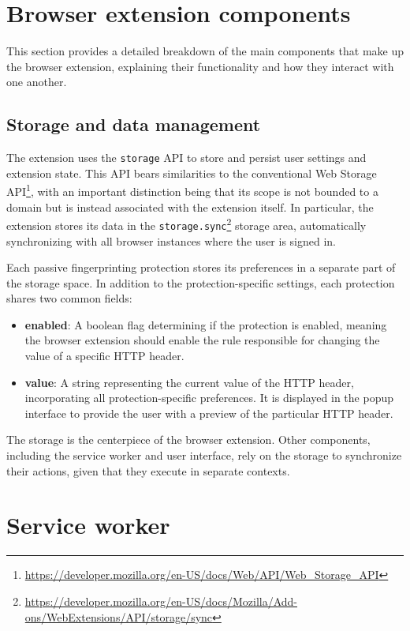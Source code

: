\section{Browser extension components}

This section provides a detailed breakdown of the main components that make up the browser extension, explaining their functionality and how they interact with one another.

\subsection{Storage and data management}

The extension uses the \texttt{storage} API to store and persist user settings and extension state. This API bears similarities to the conventional Web Storage API\footnote{\url{https://developer.mozilla.org/en-US/docs/Web/API/Web_Storage_API}}, with an important distinction being that its scope is not bounded to a domain but is instead associated with the extension itself. In particular, the extension stores its data in the \texttt{storage.sync}\footnote{\url{https://developer.mozilla.org/en-US/docs/Mozilla/Add-ons/WebExtensions/API/storage/sync}} storage area, automatically synchronizing with all browser instances where the user is signed in.

Each passive fingerprinting protection stores its preferences in a separate part of the storage space. In addition to the protection-specific settings, each protection shares two common fields:

\begin{itemize}
	\item \textbf{enabled}: A boolean flag determining if the protection is enabled, meaning the browser extension should enable the rule responsible for changing the value of a specific HTTP header.
	\item \textbf{value}: A string representing the current value of the HTTP header, incorporating all protection-specific preferences. It is displayed in the popup interface to provide the user with a preview of the particular HTTP header.
\end{itemize}

The storage is the centerpiece of the browser extension. Other components, including the service worker and user interface, rely on the storage to synchronize their actions, given that they execute in separate contexts.

\section{Service worker}

